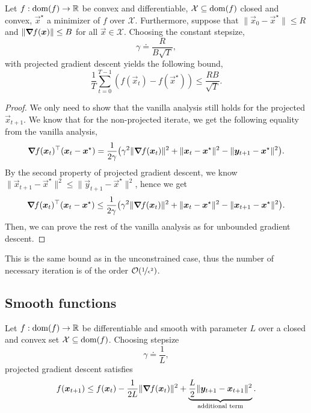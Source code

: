 \begin{theorem}
    Let $f: \mathrm{dom}(f) \to \mathbb{R}$ be convex and differentiable, $\mathcal{X} \subseteq \mathrm{dom}(f)$ closed and
    convex, $\vec{x}^\star$ a minimizer of $f$ over $\mathcal{X}$. Furthermore, suppose that
    $\|\vec{x}_0-\vec{x}^\star\| \leq R$ and $\|\bm{\nabla}_{\! } f(\bm{x})\| \leq B$ for all
    $\vec{x} \in \mathcal{X}$. Choosing the constant stepsize, \[
        \gamma \doteq \frac{R}{B\sqrt{T}},
    \]
    with projected gradient descent yields the following bound, \[
        \frac{1}{T} \sum_{t=0}^{T-1}  (f(\vec{x}_t) - f(\vec{x}^\star)) \leq \frac{RB}{\sqrt{T}}.
    \]
\end{theorem}

\begin{proof}
    We only need to show that the vanilla analysis still holds for the projected $\vec{x}_{t+1}$. We
    know that for the non-projected iterate, we get the following equality from the vanilla analysis, \[
        \transpose{\grad{f(\vec{x}_t)}{}} (\vec{x}_t - \vec{x}^\star) = \frac{1}{2 \gamma} \lft( \gamma^2 \| \grad{f(\vec{x}_t)}{} \|^2 + \| \vec{x}_t - \vec{x}^\star \|^2 - \| \vec{y}_{t+1} - \vec{x}^\star \|^2 \rgt).
    \]
    By the second property of projected gradient descent, we know $\| \vec{x}_{t+1} - \vec{x}^\star
        \|^2 \leq \| \vec{y}_{t+1} - \vec{x}^\star \|^2$, hence we get \[
        \transpose{\grad{f(\vec{x}_t)}{}} (\vec{x}_t - \vec{x}^\star) \leq \frac{1}{2 \gamma} \lft( \gamma^2 \| \grad{f(\vec{x}_t)}{} \|^2 + \| \vec{x}_t - \vec{x}^\star \|^2 - \| \vec{x}_{t+1} - \vec{x}^\star \|^2 \rgt).
    \]
    Then, we can prove the rest of the vanilla analysis as for unbounded gradient descent.
\end{proof}

This is the same bound as in the unconstrained case, thus the number of necessary iteration is of
the order $\bigo{\nicefrac{1}{\epsilon^2}}$.

\subsection{Smooth functions}

\begin{lemma}
    Let $f: \mathrm{dom}(f) \to \mathbb{R}$ be differentiable and smooth with parameter $L$ over a closed and convex
    set $\mathcal{X} \subseteq \mathrm{dom}(f)$. Choosing stepsize \[
        \gamma \doteq \frac{1}{L},
    \]
    projected gradient descent satisfies \[
        f(\bm{x}_{t+1}) \leq f(\bm{x}_t) - \frac{1}{2L} \| \bm{\nabla}_{\! } f(\bm{x}_t) \|^2 + \underbrace{\frac{L}{2} \| \bm{y}_{t+1} - \bm{x}_{t+1} \|^2}_{\text{additional term}}.
    \]
\end{lemma}

